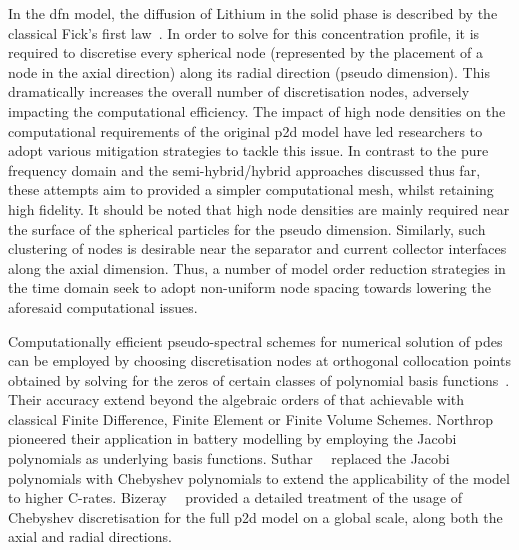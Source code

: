 In the \gls{dfn} model, the diffusion of Lithium in the solid phase is described
by the classical  Fick's first law~\cite{Fick1995}. In order to  solve for this
concentration  profile,  it  is  required to  discretise  every  spherical  node
(represented by the placement of a node in the axial direction) along its radial
direction (pseudo dimension). This dramatically  increases the overall number of
discretisation  nodes, adversely  impacting  the  computational efficiency.  The
impact of high node densities on  the computational requirements of the original
\gls{p2d}  model have  led researchers  to adopt  various mitigation  strategies
to  tackle  this  issue. In  contrast  to  the  pure  frequency domain  and  the
semi-hybrid/hybrid approaches discussed thus far, these attempts aim to provided
a simpler computational mesh, whilst retaining high fidelity. It should be noted
that high node  densities are mainly required near the  surface of the spherical
particles for the pseudo   dimension. Similarly, such clustering
of nodes is desirable near the  separator and current collector interfaces along
the axial  dimension.
Thus, a number  of model order reduction  strategies in the time  domain seek to
adopt  non-uniform node  spacing  towards lowering  the aforesaid  computational
issues.


Computationally    efficient     pseudo-spectral    schemes     for    numerical
solution   of   \gls{pde}s   can be employed    by   choosing   discretisation
nodes    at    orthogonal    collocation     points    obtained    by    solving
for     the    zeros     of    certain     classes    of     polynomial    basis
functions~\cite{Ferguson1971,Trefethen2000,Boyd2001,Shizgal2015,Dutykh2016}.
Their accuracy extend beyond  the  algebraic  orders of that achievable with
classical  Finite  Difference,  Finite Element  or Finite Volume Schemes.
Northrop~\etal{}~\cite{Northrop2011} pioneered their application in battery
modelling by employing the Jacobi polynomials as underlying basis functions.
Suthar~\etal{}~\cite{Suthar2014} replaced the Jacobi polynomials with Chebyshev
polynomials to extend the applicability of the model to higher C-rates.
Bizeray~\etal{}~\cite{Bizeray2015}    provided   a detailed treatment of the
usage of Chebyshev discretisation  for   the  full   \gls{p2d} model   on  a
global  scale,  \ie{}  along  both   the  axial  and  radial directions.


